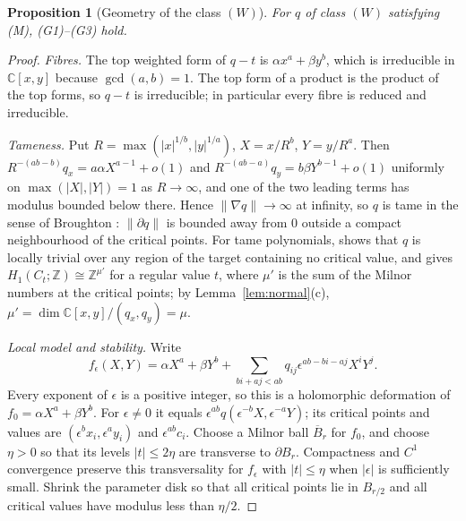 \documentclass[11pt]{article}
\numberwithin{equation}{section}
\newtheorem{proposition}[proposition]{Proposition}
\theoremstyle{definition}
\theoremstyle{remark}
\newcommand{\C}{\mathbb C}
\newcommand{\Z}{\mathbb Z}
\begin{document}
\begin{proposition}[Geometry of the class $(W)$]\label{prop:geometry}
For $q$ of class $(W)$ satisfying \textup{(M)}, \textup{(G1)--(G3)} hold.
\end{proposition}
\begin{proof}
\emph{Fibres.} The top weighted form of $q-t$ is $\alpha x^a+\beta y^b$, which is
irreducible in $\C[x,y]$ because $\gcd(a,b)=1$. The top form of a product is
the product of the top forms, so $q-t$ is irreducible; in particular every
fibre is reduced and irreducible.

\emph{Tameness.} Put $R=\max(|x|^{1/b},|y|^{1/a})$, $X=x/R^b$, $Y=y/R^a$. Then
$R^{-(ab-b)}q_x=a\alpha X^{a-1}+o(1)$ and $R^{-(ab-a)}q_y=b\beta Y^{b-1}+o(1)$
uniformly on $\max(|X|,|Y|)=1$ as $R\to\infty$, and one of the two leading terms
has modulus bounded below there. Hence $\|\nabla q\|\to\infty$ at infinity, so
$q$ is tame in the sense of Broughton \cite[Definition~3.1]{Br}: $\|\partial q\|$
is bounded away from $0$ outside a compact neighbourhood of the critical
points. For tame polynomials, \cite[p.~230]{Br} shows that $q$ is locally
trivial over any region of the target containing no critical value, and
\cite[Theorem~1.2 and p.~231]{Br} gives $H_1(C_t;\Z)\cong\Z^{\mu'}$ for a regular
value $t$, where $\mu'$ is the sum of the Milnor numbers at the critical points;
by Lemma~\ref{lem:normal}(c), $\mu'=\dim\C[x,y]/(q_x,q_y)=\mu$.

\emph{Local model and stability.} Write
\[
 f_\epsilon(X,Y)=\alpha X^a+\beta Y^b+
 \sum_{bi+aj<ab}q_{ij}\epsilon^{ab-bi-aj}X^iY^j.
\]
Every exponent of $\epsilon$ is a positive integer, so this is a holomorphic
deformation of $f_0=\alpha X^a+\beta Y^b$. For $\epsilon\ne0$ it equals
$\epsilon^{ab}q(\epsilon^{-b}X,\epsilon^{-a}Y)$; its critical points and values
are $(\epsilon^b x_i,\epsilon^a y_i)$ and $\epsilon^{ab}c_i$.
Choose a Milnor ball $\overline B_r$ for $f_0$, and choose $\eta>0$ so that its
levels $|t|\le2\eta$ are transverse to $\partial B_r$. Compactness and
$C^1$ convergence preserve this transversality for $f_\epsilon$ with
$|t|\le\eta$ when $|\epsilon|$ is sufficiently small. Shrink the parameter disk
so that all critical points lie in $B_{r/2}$ and all critical values have
modulus less than $\eta/2$.


\end{proof}
\end{document}
